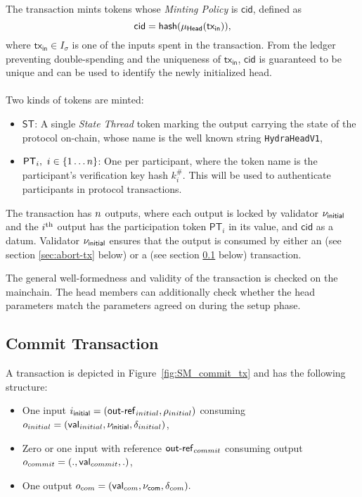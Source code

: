 \noindent The \mtxInit{} transaction mints tokens whose \emph{Minting Policy} is $\mathsf{cid}$, defined as 
$$
\mathsf{cid} = \mathsf{hash}(\mu_\mathsf{Head}(\mathsf{tx_{in}})),
$$
where $\mathsf{tx_{in}} \in I_\sigma$ is one of the inputs spent in the \mtxInit{} transaction. From the ledger preventing double-spending and the uniqueness of $\mathsf{tx_{in}}$, $\mathsf{cid}$ is guaranteed to be unique and can be used to identify the newly initialized head. \\
\\
Two kinds of tokens are minted:
\begin{itemize}
\item $\mathsf{ST}$: A single \emph{State Thread} token marking the output carrying the state of the protocol on-chain, whose name is the well known string \texttt{HydraHeadV1},
\item $\mathsf{PT}_i,\ i\in \{1 \dots n \}$: One  per participant, where the token name is the participant's verification key hash $k_i^{\#}$. This will be used to authenticate participants in protocol transactions.
\end{itemize}

\noindent The \mtxInit{} transaction has $n$ outputs, where each output is
locked by validator $\nu_\mathsf{initial}$ and the $i^{\text{th}}$ output has the participation
token $\mathsf{PT}_i$ in its value, and $\mathsf{cid}$ as a datum. Validator $\nu_\mathsf{initial}$
ensures that the output is consumed by either an \mtxAbort{} (see section \ref{sec:abort-tx} below) or a \mtxCom{} (see section \ref{sec:commit-tx} below) transaction.

The general well-formedness and validity of the \mtxInit{} transaction is
checked on the mainchain. The head members can additionally check whether the head
parameters match the parameters agreed on during the setup phase.



\subsection{Commit Transaction}\label{sec:commit-tx}

A \mtxCom{} transaction is depicted in Figure~\ref{fig:SM_commit_tx} and has the following structure:
\begin{itemize}
    \item One input $i_{\mathsf{initial}} = (\mathsf{out\textsf{-}{}ref}_{initial}, \rho_{initial})$ consuming $o_{initial} = (\mathsf{val}_{initial}, \nu_\mathsf{initial}, \delta_{initial})$,
    \item Zero or one input with reference $\mathsf{out\textsf{-}{}ref}_{commit}$ consuming output $o_{commit} = (.,\mathsf{val}_{commit},.)$,
    \item One output $o_{com} =  (\mathsf{val}_{com}, \nu_\mathsf{com}, \delta_{com}).$ 
\end{itemize}

